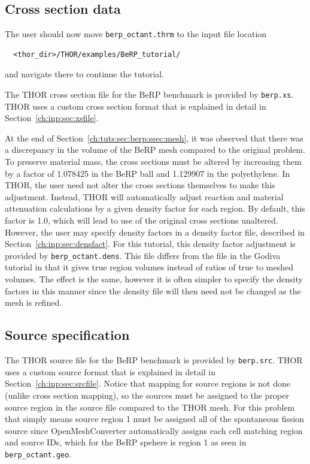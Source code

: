 \subsection{Cross section data}

The user should now move \verb"berp_octant.thrm" to the input file location
\begin{verbatim}
  <thor_dir>/THOR/examples/BeRP_tutorial/
\end{verbatim}
and navigate there to continue the tutorial.

The \ac{THOR} cross section file for the BeRP benchmark is provided by \verb"berp.xs".
\ac{THOR} uses a custom cross section format that is explained in detail in Section~\ref{ch:inp:sec:xsfile}.

At the end of Section~\ref{ch:tuts:sec:berp:ssec:mesh}, it was observed that there was a discrepancy in the volume of the BeRP mesh compared to the original problem.
To preserve material mass, the cross sections must be altered by increasing them by a factor of 1.078425 in the BeRP ball and 1.129907 in the polyethylene.
In \ac{THOR}, the user need not alter the cross sections themselves to make this adjustment.
Instead, \ac{THOR} will automatically adjust reaction and material attenuation calculations by a given density factor for each region.
By default, this factor is 1.0, which will lead to use of the original cross sections unaltered.
However, the user may specify density factors in a density factor file, described in Section~\ref{ch:inp:sec:densfact}.
For this tutorial, this density factor adjustment is provided by \verb"berp_octant.dens".
This file differs from the file in the Godiva tutorial in that it gives true region volumes instead of ratios of true to meshed volumes.
The effect is the same, however it is often simpler to specify the density factors in this manner since the density file will then need not be changed as the mesh is refined.

\subsection{Source specification}

The \ac{THOR} source file for the BeRP benchmark is provided by \verb"berp.src".
\ac{THOR} uses a custom source format that is explained in detail in Section~\ref{ch:inp:sec:srcfile}.
Notice that mapping for source regions is not done (unlike cross section mapping), so the sources must be assigned to the proper source region in the source file compared to the THOR mesh.
For this problem that simply means source region 1 must be assigned all of the spontaneous fission source since OpenMeshConverter automatically assigns each cell matching region and source IDs, which for the BeRP spehere is region 1 as seen in \verb"berp_octant.geo".


